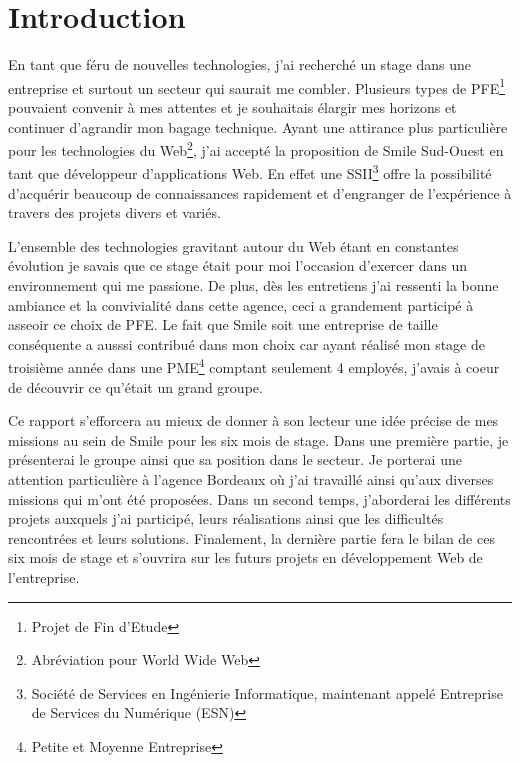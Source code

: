 \documentclass[a4paper,11pt,twoside]{report}
\begin{document}
\sffamily

\clearpage

\chapter*{Introduction}
\thispagestyle{\chead{}}
En tant que féru de nouvelles technologies, j'ai recherché un stage dans une entreprise et surtout un secteur qui saurait me combler. Plusieurs types de PFE\footnote{Projet de Fin d'Etude} pouvaient convenir à mes attentes et je souhaitais élargir mes horizons et continuer d'agrandir mon bagage technique. Ayant une attirance plus particulière pour les technologies du Web\footnote{Abréviation pour World Wide Web}, j'ai accepté la proposition de Smile Sud-Ouest en tant que développeur d'applications Web. En effet une SSII\footnote{Société de Services en Ingénierie Informatique, maintenant appelé Entreprise de Services du Numérique (ESN)} offre la possibilité d'acquérir beaucoup de connaissances rapidement et d'engranger de l'expérience à travers des projets divers et variés.\newline

L'ensemble des technologies gravitant autour du Web étant en constantes évolution je savais que ce stage était pour moi l'occasion d'exercer dans un environnement qui me passione. De plus, dès les entretiens j'ai ressenti la bonne ambiance et la convivialité dans cette agence, ceci a grandement participé à asseoir ce choix de PFE. Le fait que Smile soit une entreprise de taille conséquente a ausssi contribué dans mon choix car ayant réalisé mon stage de troisième année dans une PME\footnote{Petite et Moyenne Entreprise} comptant seulement 4 employés, j'avais à coeur de découvrir ce qu'était un grand groupe.\newline 

Ce rapport s’efforcera au mieux de donner à son lecteur une idée précise de mes missions au sein de Smile pour les six mois de stage. Dans une première partie, je présenterai le groupe ainsi que sa position dans le secteur. Je porterai une attention particulière à l'agence Bordeaux où j'ai travaillé ainsi qu'aux diverses missions qui m'ont été proposées. Dans un second temps, j’aborderai les différents projets auxquels j'ai participé, leurs réalisations ainsi que les difficultés rencontrées et leurs solutions. Finalement, la dernière partie fera le bilan de ces six mois de stage et s'ouvrira sur les futurs projets en développement Web de l’entreprise.
\end{document}
